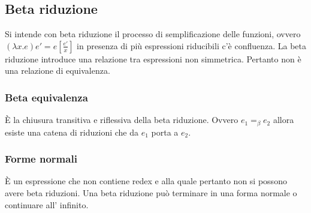 \subsection{Beta riduzione}
Si intende con beta riduzione il processo di semplificazione delle funzioni, ovvero $(\lambda x.e)e'=e[\frac{e'}{x}]$ in presenza di pi\`u espressioni riducibili c'\`e 
confluenza. La beta riduzione introduce una relazione tra espressioni non simmetrica. Pertanto non \`e una relazione di equivalenza.
\subsubsection{Beta equivalenza}
\`E la chiusura transitiva e riflessiva della beta riduzione. Ovvero $e_1=_\beta e_2$ allora esiste una catena di riduzioni che da $e_1$ porta a $e_2$. 
\subsubsection{Forme normali}
\`E un espressione che non contiene redex e alla quale pertanto non si possono avere beta riduzioni. Una beta riduzione pu\`o terminare in una forma normale o continuare all'
infinito. 